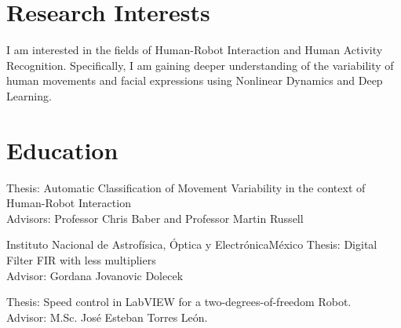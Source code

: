 \documentclass[10pt,a4paper,roman]{moderncv}
\begin{document}
\section{Research Interests}
\begin{changemargin}{2.4cm}{0.5cm}
I am interested in the fields of Human-Robot Interaction and Human Activity Recognition.
Specifically, I am gaining deeper understanding of the variability of human movements 
and facial expressions using Nonlinear Dynamics and Deep Learning.
\end{changemargin}



\section{Education}
  {Thesis: Automatic Classification of Movement Variability in the context of Human-Robot Interaction
  \href{https://github.com/mxochicale/PhD}{\faGithubAlt}
   \\ Advisors: Professor Chris Baber and  Professor Martin Russell  }

  {Instituto Nacional de Astrof\'isica, \'Optica y Electr\'onica}{M\'exico}{}
  {Thesis: Digital Filter FIR with less multipliers
  \href{https://github.com/mxochicale/publications/blob/master/Thesis/M.Sc./doc/MPXochicale_MScThesis-2016.pdf}{\faFilePdfO}
  \href{https://github.com/mxochicale/publications/tree/master/Thesis/M.Sc.}{\faGithubAlt}
  \\ Advisor: Gordana Jovanovic Dolecek}

  {Thesis: Speed control in LabVIEW for a two-degrees-of-freedom Robot.
  \href{https://github.com/mxochicale/publications/blob/master/Thesis/B.Eng./doc/MPXochicale_BachelorEngThesis-2003.pdf}{\faFilePdfO}
  \href{https://github.com/mxochicale/publications/tree/master/Thesis/B.Eng.}{\faGithubAlt}
  \\ Advisor: M.Sc. Jos\'e Esteban Torres Le\'on.}
\end{document}
